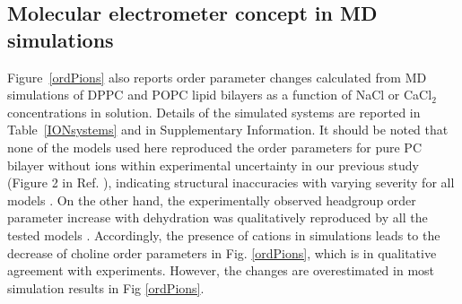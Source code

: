 \documentclass[pre,aps,floatfix,authordate1-4,twocolumn]{revtex4-1}
\begin{document}
\subsection{Molecular electrometer concept in MD simulations}\label{electrometerinsimulations}

Figure~\ref{ordPions} also reports order parameter changes calculated from MD simulations
of DPPC and POPC lipid bilayers as a function of NaCl or CaCl$_2$ concentrations in solution. 
Details of the simulated systems are reported in Table~\ref{IONsystems} and in Supplementary Information. 
It should be noted that none of the models used here 
reproduced the order parameters for pure PC bilayer without ions 
within experimental uncertainty in our previous study (Figure 2 in Ref. \cite{botan15}), 
indicating structural inaccuracies with varying severity for all models \cite{botan15}.
On the other hand, the experimentally observed headgroup order parameter increase with dehydration
was qualitatively reproduced by all the tested models \cite{botan15}. 
Accordingly, the presence of cations in simulations leads to the decrease 
of choline order parameters in Fig. \ref{ordPions}, which is in qualitative
agreement with experiments. However, the changes are overestimated in most
simulation results in Fig \ref{ordPions}. 
\end{document}
